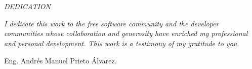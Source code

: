 \chapter*{}
\vspace{1cm}
\begin{center}
	\textit{DEDICATION}
\end{center}
\vspace{1.5cm}
\begin{flushright}
	\textit{I dedicate this work to the free software community and the developer communities whose collaboration and generosity have enriched my professional and personal development. This work is a testimony of my gratitude to you.}
\end{flushright}
\vspace{1.0cm}
\begin{flushright}
	Eng. Andrés Manuel Prieto Álvarez.
\end{flushright}